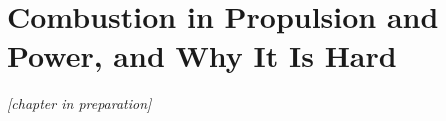 \chapter{Combustion in Propulsion and Power, and Why It Is Hard}\label{ch:intro}

\emph{[chapter in preparation]}
